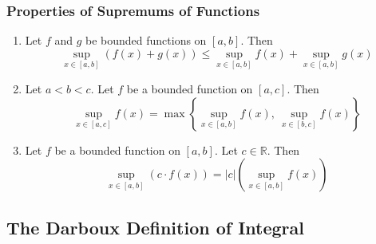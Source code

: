\documentclass[11pt]{article}
\def\R{{\mathbb R}}
\begin{document}
\subsubsection{Properties of Supremums of Functions}
\begin{enumerate}
    \item Let $f$ and $g$ be bounded functions on $[a,b]$. Then
          $$
              \sup_{x\in[a,b]} (f(x)+g(x)) \leq \sup_{x\in[a,b]} f(x) + \sup_{x\in[a,b]} g(x)
          $$
    \item Let $a<b<c$. Let $f$ be a bounded function on $[a,c]$. Then
          $$
              \sup_{x\in[a,c]} f(x)=\max\left\{\sup_{x\in[a,b]} f(x),~\sup_{x\in[b,c]} f(x) \right\}
          $$
    \item Let $f$ be a bounded function on $[a,b]$. Let $c\in\R$. Then
          $$
              \sup_{x\in[a,b]} (c\cdot f(x)) = |c|\left(\sup_{x\in[a,b]} f(x)\right)
          $$
\end{enumerate}
\subsection{The Darboux Definition of Integral}
\end{document}
